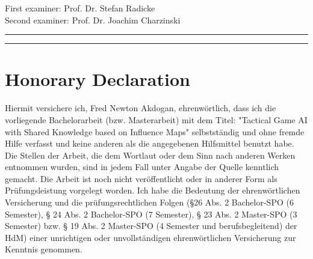 \documentclass[]{report}
\begin{document}
\begin{titlepage}
		\vfill %
		
		
		
		{\small First examiner: Prof. Dr. Stefan Radicke\\[0.5\baselineskip]}
		{\small Second examiner: Prof. Dr. Joachim Charzinski\\[0.5\baselineskip]}
		
		\vspace{0.1\textheight} %
		
		
		\rule{\textwidth}{0.4pt} %
		
		\vspace{2pt}\vspace{-\baselineskip} %
		
		\rule{\textwidth}{1pt} %
		
	\end{titlepage}
	
	
	\begin{abstract}
		
	\end{abstract}
	
	\newpage
	\chapter*{Honorary Declaration}
	\thispagestyle{empty}
	Hiermit versichere ich, Fred Newton Akdogan, ehrenwörtlich, dass ich die
	vorliegende Bachelorarbeit (bzw. Masterarbeit) mit dem Titel: "Tactical Game AI with Shared Knowledge based on Influence Maps" selbstständig und ohne fremde Hilfe verfasst und keine
	anderen als die angegebenen Hilfsmittel benutzt habe. Die Stellen der Arbeit, die dem
	Wortlaut oder dem Sinn nach anderen Werken entnommen wurden, sind in jedem Fall
	unter Angabe der Quelle kenntlich gemacht. Die Arbeit ist noch nicht veröffentlicht oder
	in anderer Form als Prüfungsleistung vorgelegt worden.
	Ich habe die Bedeutung der ehrenwörtlichen Versicherung und die prüfungsrechtlichen
	Folgen (§26 Abs. 2 Bachelor-SPO (6 Semester), § 24 Abs. 2 Bachelor-SPO (7 Semester), §
	23 Abs. 2 Master-SPO (3 Semester) bzw. § 19 Abs. 2 Master-SPO (4 Semester und
	berufsbegleitend) der HdM) einer unrichtigen oder unvollständigen ehrenwörtlichen
	Versicherung zur Kenntnis genommen.
	
\end{document}
